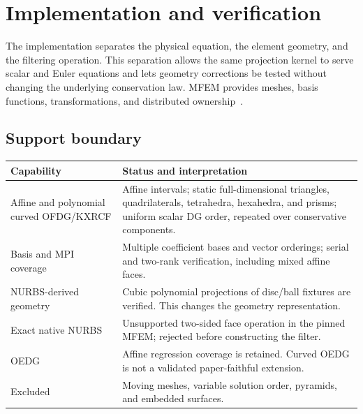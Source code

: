 \chapter{Implementation and verification}
\label{chap:implementation}
The implementation separates the physical equation, the element geometry, and
the filtering operation. This separation allows the same projection kernel to
serve scalar and Euler equations and lets geometry corrections be tested
without changing the underlying conservation law. MFEM provides meshes, basis
functions, transformations, and distributed ownership~\cite{AndersonEtAl2021}.

\section{Support boundary}
\label{sec:support-boundary}
\begin{center}
\begin{tabular}{@{}p{}p{}@{}}
\toprule
Capability & Status and interpretation\\\midrule
Affine and polynomial curved OFDG/KXRCF & Affine intervals; static full-dimensional triangles,
quadrilaterals, tetrahedra, hexahedra, and prisms; uniform scalar DG order,
repeated over conservative components.\\
Basis and MPI coverage & Multiple coefficient bases and vector orderings;
serial and two-rank verification, including mixed affine faces.\\
NURBS-derived geometry & Cubic polynomial projections of disc/ball fixtures
are verified. This changes the geometry representation.\\
Exact native NURBS & Unsupported two-sided face operation in the pinned MFEM;
rejected before constructing the filter.\\
OEDG & Affine regression coverage is retained. Curved OEDG is not a validated
paper-faithful extension.\\
Excluded & Moving meshes, variable solution order, pyramids, and embedded
surfaces.\\\bottomrule
\end{tabular}
\end{center}


